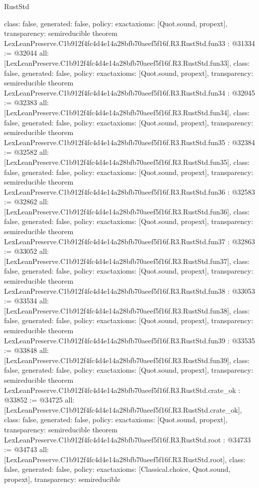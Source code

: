 \begin{lexlean}{RustStd}
\begin{coremodule}
{  class: false,
  generated: false,
  policy: exact{axioms: [Quot.sound, propext]},
  transparency: semireducible
}
theorem LexLeanPreserve.C1b912f4fc4d4e14a28bfb70aeef5f16f.R3.RustStd.fun33 : @31334 := @32044 {
  all: [LexLeanPreserve.C1b912f4fc4d4e14a28bfb70aeef5f16f.R3.RustStd.fun33],
  class: false,
  generated: false,
  policy: exact{axioms: [Quot.sound, propext]},
  transparency: semireducible
}
theorem LexLeanPreserve.C1b912f4fc4d4e14a28bfb70aeef5f16f.R3.RustStd.fun34 : @32045 := @32383 {
  all: [LexLeanPreserve.C1b912f4fc4d4e14a28bfb70aeef5f16f.R3.RustStd.fun34],
  class: false,
  generated: false,
  policy: exact{axioms: [Quot.sound, propext]},
  transparency: semireducible
}
theorem LexLeanPreserve.C1b912f4fc4d4e14a28bfb70aeef5f16f.R3.RustStd.fun35 : @32384 := @32582 {
  all: [LexLeanPreserve.C1b912f4fc4d4e14a28bfb70aeef5f16f.R3.RustStd.fun35],
  class: false,
  generated: false,
  policy: exact{axioms: [Quot.sound, propext]},
  transparency: semireducible
}
theorem LexLeanPreserve.C1b912f4fc4d4e14a28bfb70aeef5f16f.R3.RustStd.fun36 : @32583 := @32862 {
  all: [LexLeanPreserve.C1b912f4fc4d4e14a28bfb70aeef5f16f.R3.RustStd.fun36],
  class: false,
  generated: false,
  policy: exact{axioms: [Quot.sound, propext]},
  transparency: semireducible
}
theorem LexLeanPreserve.C1b912f4fc4d4e14a28bfb70aeef5f16f.R3.RustStd.fun37 : @32863 := @33052 {
  all: [LexLeanPreserve.C1b912f4fc4d4e14a28bfb70aeef5f16f.R3.RustStd.fun37],
  class: false,
  generated: false,
  policy: exact{axioms: [Quot.sound, propext]},
  transparency: semireducible
}
theorem LexLeanPreserve.C1b912f4fc4d4e14a28bfb70aeef5f16f.R3.RustStd.fun38 : @33053 := @33534 {
  all: [LexLeanPreserve.C1b912f4fc4d4e14a28bfb70aeef5f16f.R3.RustStd.fun38],
  class: false,
  generated: false,
  policy: exact{axioms: [Quot.sound, propext]},
  transparency: semireducible
}
theorem LexLeanPreserve.C1b912f4fc4d4e14a28bfb70aeef5f16f.R3.RustStd.fun39 : @33535 := @33848 {
  all: [LexLeanPreserve.C1b912f4fc4d4e14a28bfb70aeef5f16f.R3.RustStd.fun39],
  class: false,
  generated: false,
  policy: exact{axioms: [Quot.sound, propext]},
  transparency: semireducible
}
theorem LexLeanPreserve.C1b912f4fc4d4e14a28bfb70aeef5f16f.R3.RustStd.crate_ok : @33852 := @34725 {
  all: [LexLeanPreserve.C1b912f4fc4d4e14a28bfb70aeef5f16f.R3.RustStd.crate_ok],
  class: false,
  generated: false,
  policy: exact{axioms: [Quot.sound, propext]},
  transparency: semireducible
}
theorem LexLeanPreserve.C1b912f4fc4d4e14a28bfb70aeef5f16f.R3.RustStd.root : @34733 := @34743 {
  all: [LexLeanPreserve.C1b912f4fc4d4e14a28bfb70aeef5f16f.R3.RustStd.root],
  class: false,
  generated: false,
  policy: exact{axioms: [Classical.choice, Quot.sound, propext]},
  transparency: semireducible
}


\end{coremodule}
\end{lexlean}
